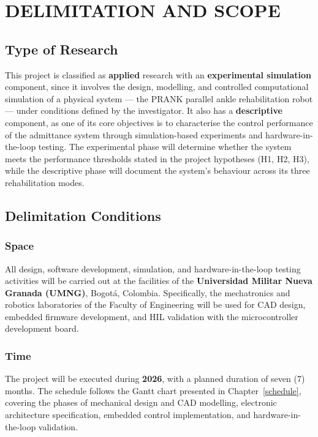 \chapter{DELIMITATION AND SCOPE}\label{delimitation_scope}
\graphicspath{{images/}}

\section{Type of Research}

This project is classified as \textbf{applied} research with an \textbf{experimental simulation} component, since it involves the design, modelling, and controlled computational simulation of a physical system — the PRANK parallel ankle rehabilitation robot — under conditions defined by the investigator.
It also has a \textbf{descriptive} component, as one of its core objectives is to characterise the control performance of the admittance system through simulation-based experiments and hardware-in-the-loop testing.
The experimental phase will determine whether the system meets the performance thresholds stated in the project hypotheses (H1, H2, H3), while the descriptive phase will document the system's behaviour across its three rehabilitation modes.

\section{Delimitation Conditions}

\subsection*{Space}

All design, software development, simulation, and hardware-in-the-loop testing activities will be carried out at the facilities of the \textbf{Universidad Militar Nueva Granada (UMNG)}, Bogotá, Colombia.
Specifically, the mechatronics and robotics laboratories of the Faculty of Engineering will be used for CAD design, embedded firmware development, and HIL validation with the microcontroller development board.

\subsection*{Time}

The project will be executed during \textbf{2026}, with a planned duration of seven (7) months.
The schedule follows the Gantt chart presented in Chapter~\ref{schedule}, covering the phases of mechanical design and CAD modelling, electronic architecture specification, embedded control implementation, and hardware-in-the-loop validation.

